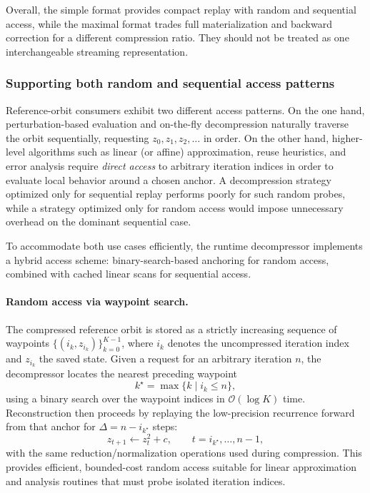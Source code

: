 Overall, the simple format provides compact replay with random and sequential
access, while the maximal format trades full materialization and backward
correction for a different compression ratio.  They should not be treated as
one interchangeable streaming representation.

\subsubsection{Supporting both random and sequential access patterns}
\label{sec:refcomp-runtime-access}

Reference-orbit consumers exhibit two different access patterns.
On the one hand, perturbation-based evaluation and on-the-fly decompression
naturally traverse the orbit sequentially, requesting
\(z_0, z_1, z_2, \dots\) in order.  On the other hand, higher-level algorithms
such as linear (or affine) approximation, reuse heuristics, and error analysis
require \emph{direct access} to arbitrary iteration indices in order to evaluate
local behavior around a chosen anchor.  A decompression strategy optimized only
for sequential replay performs poorly for such random probes, while a strategy
optimized only for random access would impose unnecessary overhead on the
dominant sequential case.

To accommodate both use cases efficiently, the runtime decompressor implements a
hybrid access scheme: binary-search-based anchoring for random access, combined
with cached linear scans for sequential access.

\paragraph{Random access via waypoint search.}
The compressed reference orbit is stored as a strictly increasing sequence of
waypoints
\(
\{(i_k, z_{i_k})\}_{k=0}^{K-1}
\),
where \(i_k\) denotes the uncompressed iteration index and \(z_{i_k}\) the saved
state.  Given a request for an arbitrary iteration \(n\), the decompressor locates the nearest
preceding waypoint
\begin{equation}
  k^\star = \max\{k \mid i_k \le n\},
  \label{eq:waypoint-search}
\end{equation}
using a binary search over the waypoint indices in
\(\mathcal{O}(\log K)\) time.  Reconstruction then proceeds by replaying the
low-precision recurrence forward from that anchor for
\(\Delta = n - i_{k^\star}\) steps:
\begin{equation}
  z_{t+1} \leftarrow z_t^2 + c,
  \qquad t = i_{k^\star}, \dots, n-1,
  \label{eq:replay-recurrence}
\end{equation}
with the same reduction/normalization operations used during compression.  This
provides efficient, bounded-cost random access suitable for linear approximation
and analysis routines that must probe isolated iteration indices.

